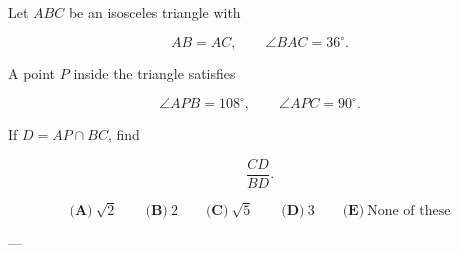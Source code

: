 Let \(ABC\) be an isosceles triangle with



\[
AB=AC,\qquad \angle BAC=36^\circ.
\]

A point \(P\) inside the triangle satisfies



\[
\angle APB=108^\circ,\qquad \angle APC=90^\circ.
\]

If \(D=AP\cap BC\), find



\[
\dfrac{CD}{BD}.
\]

\[
\textbf{(A)}\ \sqrt2
\qquad
\textbf{(B)}\ 2
\qquad
\textbf{(C)}\ \sqrt5
\qquad
\textbf{(D)}\ 3
\qquad
\textbf{(E)}\ \text{None of these}
\]

---
